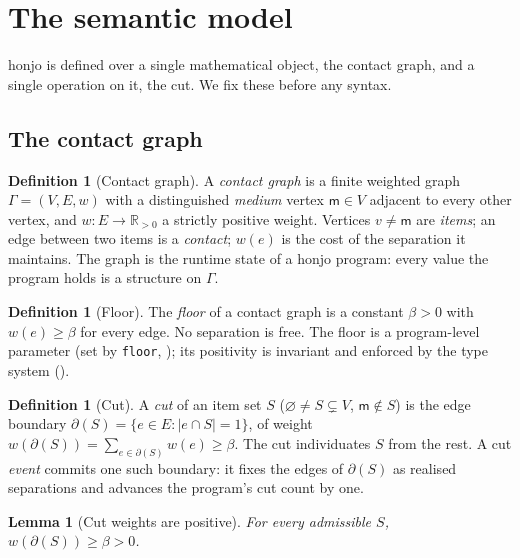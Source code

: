 \documentclass[11pt,twocolumn,a4paper]{article}
\theoremstyle{thmstyle}
\newtheorem{lemma}[theorem]{Lemma}
\theoremstyle{definition}
\newtheorem{definition}[theorem]{Definition}
\theoremstyle{remark}
\newcommand{\R}{\mathbb{R}}
\newcommand{\flo}{\beta}
\newcommand{\cut}{\partial}
\newcommand{\medium}{\mathsf{m}}
\newcommand{\hj}[1]{\texttt{#1}}
\newcommand{\abs}[1]{\lvert#1\rvert}
\begin{document}
\section{The semantic model}
\label{sec:model}

honjo is defined over a single mathematical object, the contact graph,
and a single operation on it, the cut. We fix these before any syntax.

\subsection{The contact graph}

\begin{definition}[Contact graph]
\label{def:contact-graph}
A \emph{contact graph} is a finite weighted graph $\Gamma=(V,E,w)$ with a
distinguished \emph{medium} vertex $\medium\in V$ adjacent to every other
vertex, and $w\colon E\to\R_{>0}$ a strictly positive weight. Vertices
$v\neq\medium$ are \emph{items}; an edge between two items is a
\emph{contact}; $w(e)$ is the cost of the separation it maintains. The
graph is the runtime state of a honjo program: every value the program
holds is a structure on $\Gamma$.
\end{definition}

\begin{definition}[Floor]
\label{def:floor}
The \emph{floor} of a contact graph is a constant $\flo>0$ with
$w(e)\ge\flo$ for every edge. No separation is free. The floor is a
program-level parameter (set by \hj{floor}, ); its
positivity is invariant and enforced by the type system
().
\end{definition}

\begin{definition}[Cut]
\label{def:cut}
A \emph{cut} of an item set $S$ ($\varnothing\neq S\subsetneq V$,
$\medium\notin S$) is the edge boundary
$\cut(S)=\{e\in E: \abs{e\cap S}=1\}$, of weight
$w(\cut(S))=\sum_{e\in\cut(S)}w(e)\ge\flo$. The cut individuates $S$ from
the rest. A cut \emph{event} commits one such boundary: it fixes the
edges of $\cut(S)$ as realised separations and advances the program's
cut count by one.
\end{definition}

\begin{lemma}[Cut weights are positive]
\label{lem:cut-positive}
For every admissible $S$, $w(\cut(S))\ge\flo>0$.
\end{lemma}
\end{document}
